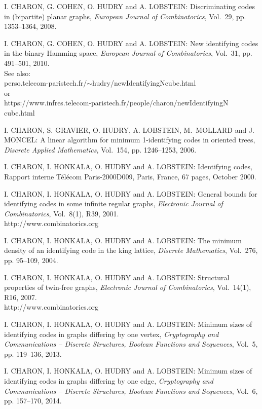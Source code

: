 \begin{thebibliography}{999}
I. CHARON, G. COHEN, O. HUDRY and A. LOBSTEIN: Discriminating codes in (bipartite) planar graphs, {\it European Journal of Combinatorics}, Vol.~29, pp. 1353--1364, 2008.

  I. CHARON, G. COHEN, O. HUDRY and A. LOBSTEIN: New identifying codes in the binary Hamming space, {\it European Journal of Combinatorics}, Vol.~31, pp. 491--501, 2010.\\
See also: \\perso.telecom-paristech.fr/$\sim$hudry/newIdentifyingNcube.html\\or\\
https://www.infres.telecom-paristech.fr/people/charon/newIdentifyingN cube.html

I. CHARON, S. GRAVIER, O. HUDRY, A. LOBSTEIN, M.~MOLLARD and J. MONCEL: A linear algorithm for minimum 1-identifying codes in oriented trees, {\it Discrete Applied Mathematics}, Vol.~154, pp. 1246--1253, 2006.

I. CHARON, I. HONKALA, O. HUDRY and A. LOBSTEIN: Identifying codes, Rapport interne T\'el\'ecom Paris-2000D009, Paris, France, 67 pages, October 2000.

I. CHARON, I. HONKALA, O. HUDRY and A. LOBSTEIN: General bounds for identifying codes in some infinite regular graphs, {\it Electronic Journal of Combinatorics}, Vol.~8(1), R39, 2001.\\
http://www.combinatorics.org

I. CHARON, I. HONKALA, O. HUDRY and A. LOBSTEIN: The minimum density of an identifying code in the king lattice, {\it Discrete Mathematics}, Vol.~276, pp. 95--109, 2004.

I. CHARON, I. HONKALA, O. HUDRY and A. LOBSTEIN: Structural properties of twin-free graphs, {\it Electronic Journal of Combinatorics}, Vol.~14(1), R16, 2007.\\
http://www.combinatorics.org

I. CHARON, I. HONKALA, O. HUDRY and A. LOBSTEIN: Minimum sizes of identifying codes in graphs differing by one vertex, {\it Cryptography and Communications -- Discrete Structures, Boolean Functions and Sequences}, Vol.~5, pp. 119--136, 2013.

I. CHARON, I. HONKALA, O. HUDRY and A. LOBSTEIN: Minimum sizes of identifying codes in graphs differing by one edge, {\it Cryptography and Communications -- Discrete Structures, Boolean Functions and Sequences}, Vol.~6, pp. 157--170, 2014.


\end{thebibliography}
